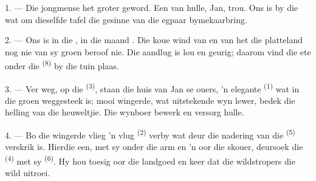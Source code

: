 %
%

\VUsaut{4.0mm}
\VUsaut{1.6mm}
\VUsaut{3.2mm}

\VUsaut{1.6mm}
\VUsaut{2.6mm}

\VUsaut{3.0mm}

1. --- Die jongmense het groter geword. Een van hulle, Jan, trou. Ons is by die
 wat om dieselfde tafel die gesinne van die egpaar bymekaarbring.

2. --- Ons is in die , in die maand . Die koue wind van
 en van  het die platteland nog nie van sy groen
 beroof nie. Die aandlug is lou en geurig; daarom vind die ete onder die
 \textsuperscript{(8)} by die tuin plaas.

3. --- Ver weg, op die  \textsuperscript{(3)}, staan die huis van Jan se
ouers, 'n elegante  \textsuperscript{(1)} wat in die groen weggesteek is;
mooi wingerde, wat uitstekende wyn lewer, bedek die helling van die heuweltjie. Die
wynboer bewerk en versorg hulle.

4. --- Bo die wingerde vlieg 'n vlug  \textsuperscript{(2)} verby wat
deur die nadering van die  \textsuperscript{(5)} verskrik is. Hierdie
een, met sy  onder die arm en 'n  oor die skouer,
deursoek die  \textsuperscript{(4)} met sy 
\textsuperscript{(6)}. Hy hou toesig oor die landgoed en keer dat die wildstropers die
wild uitroei.

